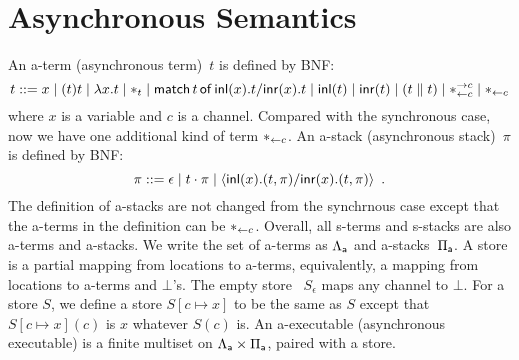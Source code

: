 \section{Asynchronous Semantics}
\label{sec:async}

An a-term (asynchronous term)~$t$ is defined by BNF:
\[
 t::= x
 \mid (t)t
 \mid \lambda x.t
 \mid \ast_t
 \mid \mathsf{match}\,{t}\,\mathsf{of}\, \mathsf{inl}({x}). {t}/ \mathsf{inr}({x}). {t}
 \mid \mathsf{inl}({t})
 \mid \mathsf{inr}({t})
 \mid (t\parallel t)
 \mid \ast^{\rightarrow {c}}_{\leftarrow{c}}
 \mid \ast_{\leftarrow{c}}
\]
where $x$ is a variable and $c$ is a channel.
Compared with the synchronous case, now we have one additional kind of term
$\ast_{\leftarrow{c}}$.
An a-stack (asynchronous stack)~$\pi$ is defined by BNF:
\[
 \pi ::= \epsilon
 \mid t\cdot \pi
 \mid \langle \mathsf{inl}({x}). ({t},{\pi})/ \mathsf{inr}({x}). ({t},{\pi})\rangle
 \enspace.
\]
The definition of a-stacks are not changed from the synchrnous case except
that the a-terms in the definition can be $\ast_{\leftarrow{c}}$.
Overall, all s-terms and s-stacks are also a-terms and a-stacks.
We write the set of a-terms as $\Lambda_{\mathsf a}$ and a-stacks~$\Pi_{\mathsf a}$.
A store is a partial mapping from locations to
a-terms, equivalently, a mapping from locations to a-terms and $\bot$'s.
The empty store%
~$S_\epsilon$ maps any channel to $\bot$.
For a store $S$, we define a store $S[c\mapsto x]$ to be
the same as $S$ except that $S[c\mapsto x](c)$ is $x$ whatever $S(c)$ is.
An a-executable (asynchronous executable)
is a finite multiset on $\Lambda_{\mathsf a} \times \Pi_{\mathsf a}$,
paired with a store.

